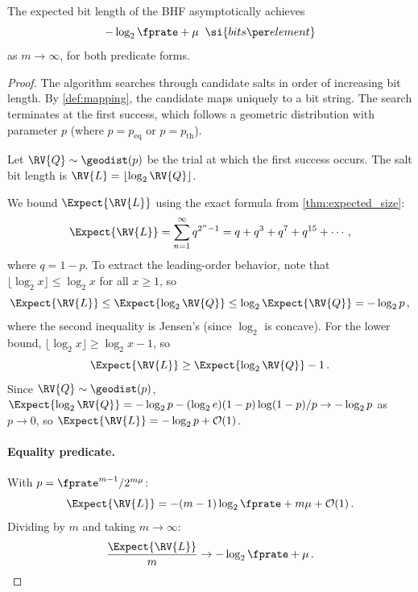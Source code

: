 \begin{theorem}
\label{thm:space}
The expected bit length of the BHF asymptotically achieves
\begin{equation}
    -\log_2 \fprate + \mu \;\; \si{bits \per element}
\end{equation}
as $m \to \infty$, for both predicate forms.
\end{theorem}
\begin{proof}
The algorithm searches through candidate salts in order of increasing bit
length.
By \cref{def:mapping}, the \nth candidate maps uniquely to a bit string.
The search terminates at the first success, which follows a geometric
distribution with parameter $p$ (where $p = p_{\mathrm{eq}}$ or
$p = p_{\mathrm{th}}$).

Let $\RV{Q} \sim \geodist(p)$ be the trial at which the first success occurs.
The salt bit length is $\RV{L} = \lfloor \log_2 \RV{Q} \rfloor$.

We bound $\Expect{\RV{L}}$ using the exact formula from
\cref{thm:expected_size}:
\begin{equation}
    \Expect{\RV{L}} = \sum_{n=1}^{\infty} q^{2^n - 1}
    = q + q^3 + q^7 + q^{15} + \cdots\,,
\end{equation}
where $q = 1 - p$.
To extract the leading-order behavior, note that
$\lfloor \log_2 x \rfloor \leq \log_2 x$ for all $x \geq 1$, so
\begin{equation}
    \Expect{\RV{L}} \leq \Expect{\log_2 \RV{Q}}
    \leq \log_2 \Expect{\RV{Q}} = -\log_2 p\,,
\end{equation}
where the second inequality is Jensen's (since $\log_2$ is concave).
For the lower bound, $\lfloor \log_2 x \rfloor \geq \log_2 x - 1$, so
\begin{equation}
    \Expect{\RV{L}} \geq \Expect{\log_2 \RV{Q}} - 1\,.
\end{equation}
Since $\RV{Q} \sim \geodist(p)$,
$\Expect{\log_2 \RV{Q}} = -\log_2 p - (\log_2 e)(1 - p)\log(1 - p)/p
\to -\log_2 p$ as $p \to 0$,
so $\Expect{\RV{L}} = -\log_2 p + \mathcal{O}(1)$.

\paragraph{Equality predicate.}
With $p = \fprate^{m-1}/2^{m\mu}$:
\begin{equation}
    \Expect{\RV{L}}
        = -(m-1)\log_2 \fprate + m\mu + \mathcal{O}(1)\,.
\end{equation}
Dividing by $m$ and taking $m \to \infty$:
\begin{equation}
    \frac{\Expect{\RV{L}}}{m} \to -\log_2 \fprate + \mu\,.
\end{equation}


\end{proof}
